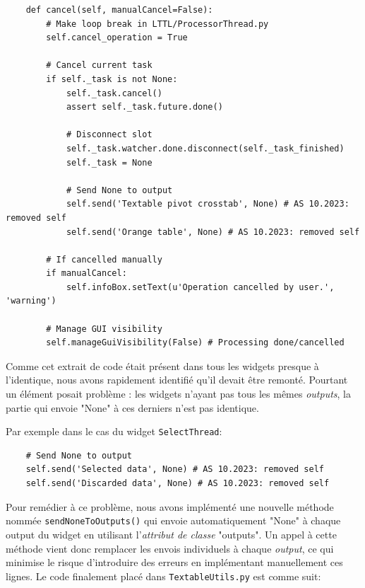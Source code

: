 \documentclass{article}
\begin{document}
\begin{verbatim}
    def cancel(self, manualCancel=False):
        # Make loop break in LTTL/ProcessorThread.py 
        self.cancel_operation = True

        # Cancel current task
        if self._task is not None:
            self._task.cancel()
            assert self._task.future.done()
            
            # Disconnect slot
            self._task.watcher.done.disconnect(self._task_finished)
            self._task = None
            
            # Send None to output 
            self.send('Textable pivot crosstab', None) # AS 10.2023: removed self
            self.send('Orange table', None) # AS 10.2023: removed self

        # If cancelled manually
        if manualCancel:
            self.infoBox.setText(u'Operation cancelled by user.', 'warning')

        # Manage GUI visibility
        self.manageGuiVisibility(False) # Processing done/cancelled
\end{verbatim}

Comme cet extrait de code était présent dans tous les widgets presque à l'identique, nous avons rapidement identifié qu'il devait être remonté. Pourtant un élément posait problème : les widgets n'ayant pas tous les mêmes \textit{outputs}, la partie qui envoie "None" à ces derniers n'est pas identique.

Par exemple dans le cas du widget \texttt{SelectThread}:

\begin{verbatim}
    # Send None to output 
    self.send('Selected data', None) # AS 10.2023: removed self
    self.send('Discarded data', None) # AS 10.2023: removed self
\end{verbatim}

Pour remédier à ce problème, nous avons implémenté une nouvelle méthode nommée \texttt{sendNoneToOutputs()} qui envoie automatiquement "None" à chaque output du widget en utilisant l'\textit{attribut de classe} "outputs". Un appel à cette méthode vient donc remplacer les envois individuels à chaque \textit{output}, ce qui minimise le risque d'introduire des erreurs en implémentant manuellement ces lignes. Le code finalement placé dans \texttt{TextableUtils.py} est comme suit:
\end{document}

